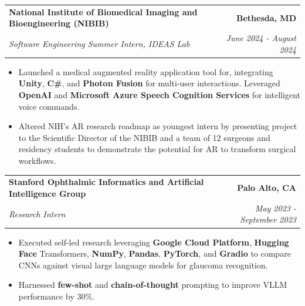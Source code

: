 \documentclass[letterpaper,11pt]{article}
\makeatletter
\newcommand{\resumeItem}[1]{
  \item\small{
    {#1 \vspace{-3pt}}
  }
}
\newcommand{\resumeSubheading}[4]{
  \vspace{-3pt}\item
    \begin{tabular*}{1.0\textwidth}[t]{l@{\extracolsep{\fill}}r}
      \textbf{#1} & \textbf{\small #2} \\
      \textit{\small#3} & \textit{\small #4} \\
    \end{tabular*}\vspace{-7pt}
}
\newcommand{\resumeItemListStart}{\begin{itemize}}
\newcommand{\resumeItemListEnd}{\end{itemize}\vspace{0pt}}
\makeatother
\begin{document}
        
        
        
        
        
        
        
        
        
            
        \resumeSubheading
        {National Institute of Biomedical Imaging and Bioengineering (NIBIB)}{Bethesda, MD}
            
            {Software Engineering Summer Intern, IDEAS Lab}{June 2024 - August 2024}
            \resumeItemListStart
                \resumeItem{Launched a medical augmented reality application tool for, integrating \textbf{Unity}, \textbf{C\#}, and \textbf{Photon Fusion} for multi-user interactions. Leveraged \textbf{OpenAI} and \textbf{Microsoft Azure Speech Cognition Services} for intelligent voice commands.}
                \resumeItem{Altered NIH's AR research roadmap as youngest intern by presenting project to the Scientific Director of the NIBIB and a team of 12 surgeons and residency students to demonstrate the potential for AR to transform surgical workflows.}
                
            \resumeItemListEnd

        
 
 
 
 
 
 
 
 
 
 

        
        \resumeSubheading
        {Stanford Ophthalmic Informatics and Artificial Intelligence Group}{Palo Alto, CA}
            
            {Research Intern}{May 2023 - September 2023}
            \resumeItemListStart
                \resumeItem{Executed self-led research leveraging \textbf{Google Cloud Platform}, \textbf{Hugging Face} Transformers, \textbf{NumPy}, \textbf{Pandas}, \textbf{PyTorch}, and \textbf{Gradio} to compare CNNs against visual large language models for glaucoma recognition.}
                \resumeItem{Harnessed \textbf{few-shot} and \textbf{chain-of-thought} prompting to improve VLLM performance by 30\%.}
            \resumeItemListEnd
            
            
            
            
            
            
            
            
            
            
            
\end{document}

